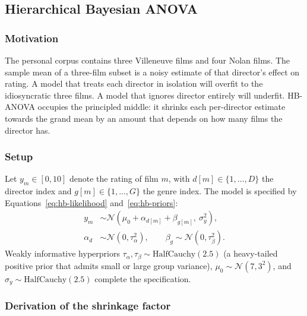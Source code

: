 \documentclass{article}
\begin{document}
\subsection{Hierarchical Bayesian ANOVA}
\label{sec:hbanova}

\subsubsection*{Motivation}

The personal corpus contains three Villeneuve films and four Nolan films. The sample mean of a three-film subset is a noisy estimate of that director's effect on rating. A model that treats each director in isolation will overfit to the idiosyncratic three films. A model that ignores director entirely will underfit. HB-ANOVA occupies the principled middle: it shrinks each per-director estimate towards the grand mean by an amount that depends on how many films the director has.

\subsubsection*{Setup}

Let $y_m \in [0, 10]$ denote the rating of film $m$, with $d[m] \in \{1, \ldots, D\}$ the director index and $g[m] \in \{1, \ldots, G\}$ the genre index. The model is specified by Equations~\ref{eq:hb-likelihood} and~\ref{eq:hb-priors}:
\begin{align}
y_m &\sim \mathcal{N}(\mu_0 + \alpha_{d[m]} + \beta_{g[m]},\ \sigma_y^2), \label{eq:hb-likelihood}\\
\alpha_d &\sim \mathcal{N}(0, \tau_\alpha^2),\qquad \beta_g \sim \mathcal{N}(0, \tau_\beta^2). \label{eq:hb-priors}
\end{align}
Weakly informative hyperpriors $\tau_\alpha, \tau_\beta \sim \mathrm{HalfCauchy}(2.5)$ (a heavy-tailed positive prior that admits small or large group variance), $\mu_0 \sim \mathcal{N}(7, 3^2)$, and $\sigma_y \sim \mathrm{HalfCauchy}(2.5)$ complete the specification.

\subsubsection*{Derivation of the shrinkage factor}
\end{document}
